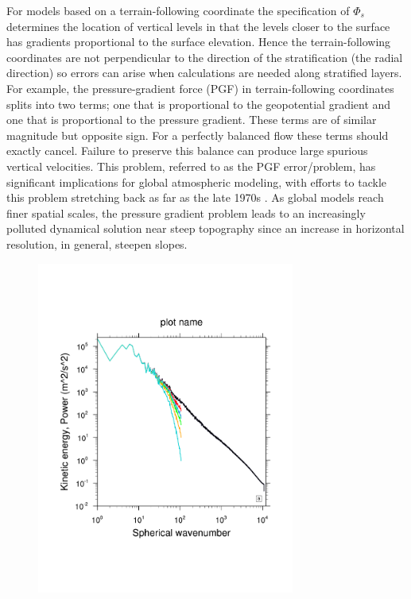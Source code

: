 \documentclass[gmd]{copernicus}
\begin{document}
For models based on a terrain-following coordinate the specification of $\Phi_s$ determines the location of vertical levels in that the levels closer to the surface has gradients proportional to the surface elevation. Hence the terrain-following coordinates are not perpendicular to the direction of the stratification (the radial direction) so errors can arise when calculations are needed along stratified layers. For example, the pressure-gradient force (PGF) in terrain-following coordinates splits into two terms; one that is proportional to the geopotential gradient and one that is proportional to the pressure gradient. These terms are of similar magnitude but opposite sign. For a perfectly balanced flow these terms should exactly cancel. Failure to preserve this balance can produce large spurious vertical velocities. This problem, referred to as the PGF error/problem, has significant implications for global atmospheric modeling, with efforts to tackle this problem stretching back as far as the late 1970s \citep{ZIJ1977BzPdA, DTMZIJ1986MAP}.  As global models reach finer spatial scales, the pressure gradient problem leads to an increasingly polluted dynamical solution near steep topography since an increase in horizontal resolution, in general, steepen slopes. 
\begin{figure}[tb]
\center\includegraphics[width=20pc,angle=0]{fig/tke-topo.pdf}
  \caption{}\label{fig:tke-topo}
\end{figure} 
\end{document}
